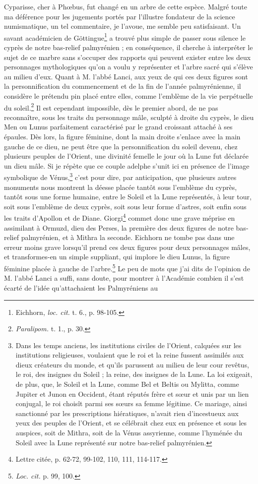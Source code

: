 \documentclass{article}
\begin{document}
Cyparisse, cher à Phœbus, fut changé en un arbre de cette espèce. Malgré toute ma déférence pour les jugements portés par l'illustre fondateur de la science numismatique, un tel commentaire, je l'avoue, me semble peu satisfaisant. Un savant académicien de Göttingue\footnote{Eichhorn, \emph{loc. cit.} t. 6., p. 98-105.} a trouvé plus simple de passer sous silence le cyprès de notre bas-relief palmyrénien ; en conséquence, il cherche à interpréter le sujet de ce marbre sans s'occuper des rapports qui peuvent exister entre les deux personnages mythologiques qu'on a voulu y représenter et l'arbre sacré qui s'élève au milieu d'eux. Quant à M. l'abbé Lanci, aux yeux de qui ces deux figures sont la personnification du commencement et de la fin de l'année palmyrénienne, il considère le prétendu pin placé entre elles, comme l'emblème de la vie perpétuelle du soleil.\footnote{\emph{Paralipom.} t. 1., p. 30.} Il est cependant impossible, dès le premier abord, de ne pas reconnaître, sous les traits du personnage mâle, sculpté à droite du cyprès, le dieu Men ou Lunus parfaitement caractérisé par le grand croissant attaché à ses épaules. Dès lors, la figure féminine, dont la main droite s'enlace avec la main gauche de ce dieu, ne peut être que la personnification du soleil devenu, chez plusieurs peuples de l'Orient, une divinité femelle le jour où la Lune fut déclarée un dieu mâle. Si je répète que ce couple adelphe s'unit ici en présence de l'image symbolique de Vénus,\footnote{Dans les temps anciens, les institutions civiles de l'Orient, calquées sur les institutions religieuses, voulaient que le roi et la reine fussent assimilés aux dieux créateurs du monde, et qu'ils parussent au milieu de leur cour revêtus, le roi, des insignes du Soleil ; la reine, des insignes de la Lune. La loi exigeait, de plus, que, le Soleil et la Lune, comme Bel et Beltis ou Mylitta, comme Jupiter et Junon en Occident, étant réputés frère et sœur et unis par un lien conjugal, le roi choisît parmi ses sœurs sa femme légitime. Ce mariage, ainsi sanctionné par les prescriptions hiératiques, n'avait rien d'incestueux aux yeux des peuples de l'Orient, et se célébrait chez eux en présence et sous les auspices, soit de Mithra, soit de la Vénus assyrienne, comme l'hyménée du Soleil avec la Lune représenté sur notre bas-relief palmyrénien.} c'est pour dire, par anticipation, que plusieurs autres monuments nous montrent la déesse placée tantôt sous l'emblème du cyprès, tantôt sous une forme humaine, entre le Soleil et la Lune représentés, à leur tour, soit sous l'emblème de deux cyprès, soit sous leur forme d'astres, soit enfin sous les traits d'Apollon et de Diane. Giorgi\footnote{Lettre citée, p. 62-72, 99-102, 110, 111, 114-117.} commet donc une grave méprise en assimilant à Ormuzd, dieu des Perses, la première des deux figures de notre bas-relief palmyrénien, et à Mithra la seconde. Eichhorn ne tombe pas dans une erreur moins grave lorsqu'il prend ces deux figures pour deux personnages mâles, et transformes-en un simple suppliant, qui implore le dieu Lunus, la figure féminine placée à gauche de l'arbre.\footnote{\emph{Loc. cit.} p. 99, 100.} Le peu de mots que j'ai dits de l'opinion de M. l'abbé Lanci a suffi, sans doute, pour montrer à l'Académie combien il s'est écarté de l'idée qu'attachaient les Palmyréniens au 
\end{document}
